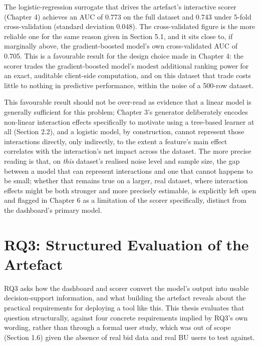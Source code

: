 The logistic-regression surrogate that drives the artefact's interactive
scorer (Chapter 4) achieves an AUC of 0.773 on the full dataset and
0.743 under 5-fold cross-validation (standard deviation 0.048). The
cross-validated figure is the more reliable one for the same reason
given in Section 5.1, and it sits close to, if marginally above, the
gradient-boosted model's own cross-validated AUC of 0.705. This is a
favourable result for the design choice made in Chapter 4: the scorer
trades the gradient-boosted model's modest additional ranking power for
an exact, auditable client-side computation, and on this dataset that
trade costs little to nothing in predictive performance, within the
noise of a 500-row dataset.

This favourable result should not be over-read as evidence that a linear
model is generally sufficient for this problem; Chapter 3's generator
deliberately encodes non-linear interaction effects specifically to
motivate using a tree-based learner at all (Section 2.2), and a logistic
model, by construction, cannot represent those interactions directly,
only indirectly, to the extent a feature's main effect correlates with
the interaction's net impact across the dataset. The more precise
reading is that, on \emph{this} dataset's realised noise level and
sample size, the gap between a model that can represent interactions and
one that cannot happens to be small; whether that remains true on a
larger, real dataset, where interaction effects might be both stronger
and more precisely estimable, is explicitly left open and flagged in
Chapter 6 as a limitation of the scorer specifically, distinct from the
dashboard's primary model.

\hypertarget{rq3-structured-evaluation-of-the-artefact}{%
\section{RQ3: Structured Evaluation of the
Artefact}\label{rq3-structured-evaluation-of-the-artefact}}

RQ3 asks how the dashboard and scorer convert the model's output into
usable decision-support information, and what building the artefact
reveals about the practical requirements for deploying a tool like this.
This thesis evaluates that question structurally, against four concrete
requirements implied by RQ3's own wording, rather than through a formal
user study, which was out of scope (Section 1.6) given the absence of
real bid data and real BU users to test against.

